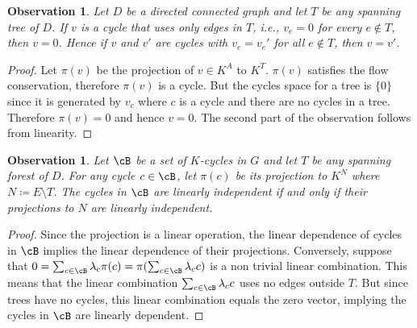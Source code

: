 \documentclass[11pt,a4paper,oneside,openany]{book}
\newtheorem{observation}[theorem]{Observation}
\numberwithin{definition}{section}
\numberwithin{theorem}{section}
\numberwithin{problem}{section}
\begin{document}
\begin{observation}
    Let $D$ be a directed connected graph and let $T$ be any spanning tree of $D$. If $v$ is a cycle that uses only edges in $T$, i.e., $v_e = 0$ for every $e \notin T$, then $v = 0$. Hence if $v$ and $v'$ are cycles with $v_e = v_e'$ for all $e \notin T$, then $v = v'$.
\end{observation}
\begin{proof}
    Let $\pi(v)$ be the projection of $v \in K^A$ to $K^T$. $\pi(v)$ satisfies the flow conservation, therefore $\pi(v)$ is a cycle. But the cycles space for a tree is $\{0\}$ since it is generated by $v_c$ where $c$ is a cycle and there are no cycles in a tree. Therefore $\pi(v)=0$ and hence $v=0$. The second part of the observation follows from linearity.
\end{proof}
\begin{observation} \label{indipendency condition}
    Let $\cB$ be a set of $K$-cycles in $G$ and let $T$ be any spanning forest of $D$. For any cycle $c \in \cB$, let $\pi(c)$ be its projection to $K^N$ where $N \coloneqq E \setminus T$. The cycles in $\cB$ are linearly independent if and only if their projections to $N$ are linearly independent.
\end{observation}
\begin{proof}
    Since the projection is a linear operation, the linear dependence of cycles in $\cB$ implies the linear dependence of their projections. Conversely, suppose that $0 = \sum_{c \in \cB}\lambda_c\pi(c) = \pi( \sum_{c \in \cB}\lambda_c c)$ is a non trivial linear combination. This means that the linear combination $ \sum_{c \in \cB}\lambda_c c$ uses no edges outside $T$. But since trees have no cycles, this linear combination equals the zero vector, implying the cycles in $\cB$ are linearly dependent.
\end{proof}
\end{document}
